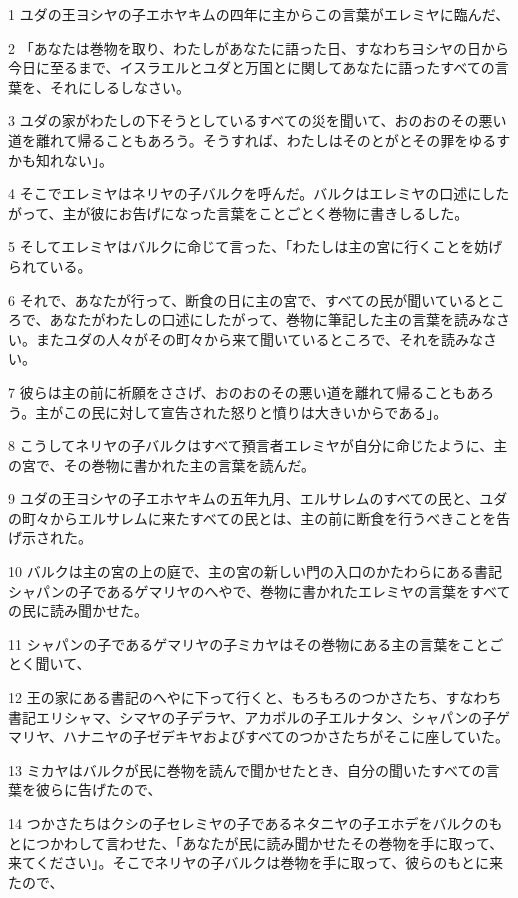 \par 1 ユダの王ヨシヤの子エホヤキムの四年に主からこの言葉がエレミヤに臨んだ、
\par 2 「あなたは巻物を取り、わたしがあなたに語った日、すなわちヨシヤの日から今日に至るまで、イスラエルとユダと万国とに関してあなたに語ったすべての言葉を、それにしるしなさい。
\par 3 ユダの家がわたしの下そうとしているすべての災を聞いて、おのおのその悪い道を離れて帰ることもあろう。そうすれば、わたしはそのとがとその罪をゆるすかも知れない」。
\par 4 そこでエレミヤはネリヤの子バルクを呼んだ。バルクはエレミヤの口述にしたがって、主が彼にお告げになった言葉をことごとく巻物に書きしるした。
\par 5 そしてエレミヤはバルクに命じて言った、「わたしは主の宮に行くことを妨げられている。
\par 6 それで、あなたが行って、断食の日に主の宮で、すべての民が聞いているところで、あなたがわたしの口述にしたがって、巻物に筆記した主の言葉を読みなさい。またユダの人々がその町々から来て聞いているところで、それを読みなさい。
\par 7 彼らは主の前に祈願をささげ、おのおのその悪い道を離れて帰ることもあろう。主がこの民に対して宣告された怒りと憤りは大きいからである」。
\par 8 こうしてネリヤの子バルクはすべて預言者エレミヤが自分に命じたように、主の宮で、その巻物に書かれた主の言葉を読んだ。
\par 9 ユダの王ヨシヤの子エホヤキムの五年九月、エルサレムのすべての民と、ユダの町々からエルサレムに来たすべての民とは、主の前に断食を行うべきことを告げ示された。
\par 10 バルクは主の宮の上の庭で、主の宮の新しい門の入口のかたわらにある書記シャパンの子であるゲマリヤのへやで、巻物に書かれたエレミヤの言葉をすべての民に読み聞かせた。
\par 11 シャパンの子であるゲマリヤの子ミカヤはその巻物にある主の言葉をことごとく聞いて、
\par 12 王の家にある書記のへやに下って行くと、もろもろのつかさたち、すなわち書記エリシャマ、シマヤの子デラヤ、アカボルの子エルナタン、シャパンの子ゲマリヤ、ハナニヤの子ゼデキヤおよびすべてのつかさたちがそこに座していた。
\par 13 ミカヤはバルクが民に巻物を読んで聞かせたとき、自分の聞いたすべての言葉を彼らに告げたので、
\par 14 つかさたちはクシの子セレミヤの子であるネタニヤの子エホデをバルクのもとにつかわして言わせた、「あなたが民に読み聞かせたその巻物を手に取って、来てください」。そこでネリヤの子バルクは巻物を手に取って、彼らのもとに来たので、
